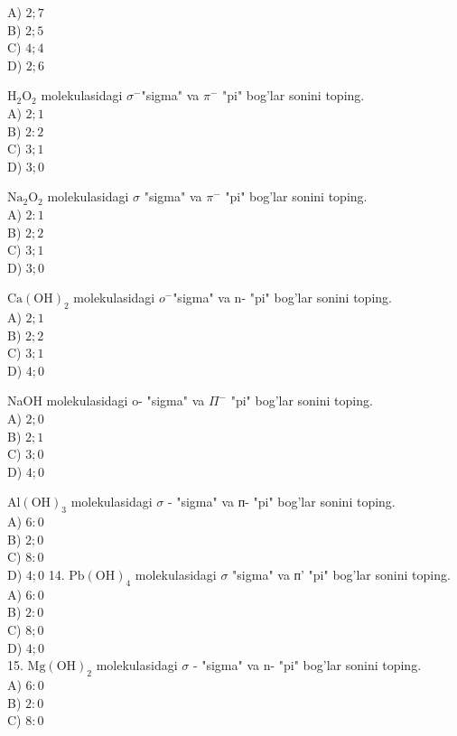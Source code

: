 A) $2 ; 7$\\
B) $2 ; 5$\\
C) $4 ; 4$\\
D) $2 ; 6$
  \item $\mathrm{H}_{2} \mathrm{O}_{2}$ molekulasidagi $\sigma^{-}$"sigma" va $\pi^{-}$ "pi" bog'lar sonini toping.\\
A) $2 ; 1$\\
B) $2: 2$\\
C) $3 ; 1$\\
D) $3 ; 0$
  \item $\mathrm{Na}_{2} \mathrm{O}_{2}$ molekulasidagi $\sigma$ "sigma" va $\pi^{-}$ "pi" bog'lar sonini toping.\\
A) $2: 1$\\
B) $2 ; 2$\\
C) $3 ; 1$\\
D) $3 ; 0$
  \item $\mathrm{Ca}(\mathrm{OH})_{2}$ molekulasidagi $o^{-}$"sigma" va n- "pi" bog'lar sonini toping.\\
A) $2 ; 1$\\
B) $2 ; 2$\\
C) $3 ; 1$\\
D) $4 ; 0$\\
  \item NaOH molekulasidagi o- "sigma" va $\Pi^{-}$ "pi" bog'lar sonini toping.\\
A) $2 ; 0$\\
B) $2 ; 1$\\
C) $3 ; 0$\\
D) $4 ; 0$
  \item $\mathrm{Al}(\mathrm{OH})_{3}$ molekulasidagi $\sigma$ - "sigma" va п- "pi" bog'lar sonini toping.\\
A) $6: 0$\\
B) $2 ; 0$\\
C) $8: 0$\\
D) $4 ; 0$
14. $\mathrm{Pb}(\mathrm{OH})_{4}$ molekulasidagi $\sigma$ "sigma" va п' "pi" bog'lar sonini toping.\\
A) $6: 0$\\
B) $2: 0$\\
C) $8 ; 0$\\
D) $4 ; 0$\\
15. $\mathrm{Mg}(\mathrm{OH})_{2}$ molekulasidagi $\sigma$ - "sigma" va n- "pi" bog'lar sonini toping.\\
A) $6: 0$\\
B) $2: 0$\\
C) $8: 0$\\
